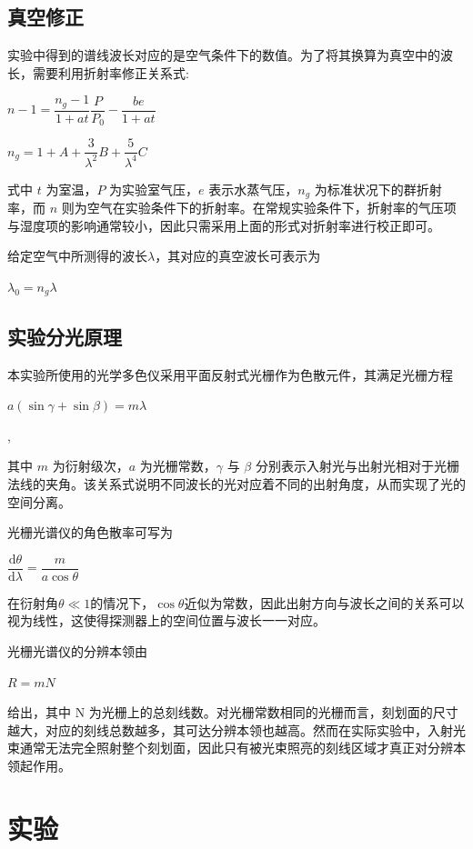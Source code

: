 \documentclass[a4paper, 1.5lines]{ctexart}
\begin{document}
        \subsection{真空修正}
        实验中得到的谱线波长对应的是空气条件下的数值。为了将其换算为真空中的波长，需要利用折射率修正关系式:

        \centerline{$n - 1 = \dfrac{n_g - 1}{1 + at} \dfrac{P}{P_0} - \dfrac{be}{1 + at}$}
        
        \centerline{$n_g = 1 + A + \dfrac{3}{\lambda^2}B + \dfrac{5}{\lambda^4}C$}

        式中 $t$ 为室温，$P$ 为实验室气压，$e$ 表示水蒸气压，$n_g$ 为标准状况下的群折射率，而 $n$ 则为空气在实验条件下的折射率。在常规实验条件下，折射率的气压项与湿度项的影响通常较小，因此只需采用上面的形式对折射率进行校正即可。
    
        给定空气中所测得的波长$ \lambda$，其对应的真空波长可表示为

        \centerline{$\lambda_0 = n_g \lambda$}

        \subsection{实验分光原理}
        本实验所使用的光学多色仪采用平面反射式光栅作为色散元件，其满足光栅方程

        \centerline{$a(\sin\gamma + \sin\beta) = m\lambda$},

        其中 $m$ 为衍射级次，$a$ 为光栅常数，$\gamma$ 与 $\beta$ 分别表示入射光与出射光相对于光栅法线的夹角。该关系式说明不同波长的光对应着不同的出射角度，从而实现了光的空间分离。

        光栅光谱仪的角色散率可写为

        \centerline{$\dfrac{\mathrm{d}\theta}{\mathrm{d}\lambda} = \dfrac{m}{a\cos\theta}$}

        在衍射角$ \theta \ll 1 $的情况下，$\cos\theta $近似为常数，因此出射方向与波长之间的关系可以视为线性，这使得探测器上的空间位置与波长一一对应。

        光栅光谱仪的分辨本领由

        \centerline{$R = mN$}

        给出，其中 N 为光栅上的总刻线数。对光栅常数相同的光栅而言，刻划面的尺寸越大，对应的刻线总数越多，其可达分辨本领也越高。然而在实际实验中，入射光束通常无法完全照射整个刻划面，因此只有被光束照亮的刻线区域才真正对分辨本领起作用。

    \section{实验}
\end{document}
